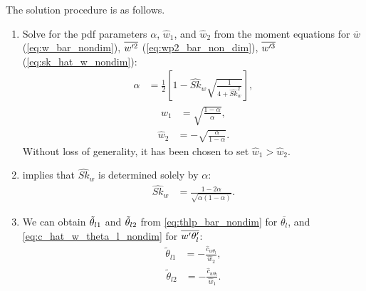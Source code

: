 The solution procedure is as follows.
\begin{enumerate}
    \item Solve for the \gls{pdf} parameters $\alpha$, $\widehat{w}_1$, and $\widehat{w}_2$ from the moment equations for $\overline{w}$ (\cref{eq:w_bar_nondim}), $\overline{w'^2}$ (\cref{eq:wp2_bar_non_dim}), $\overline{w'^3}$ (\cref{eq:sk_hat_w_nondim}):
    \begin{align}
        \label{eq:alpha_solved}
        \alpha
        &= \frac{1}{2}\left[1 - \widehat{Sk}_w \sqrt{\frac{1}{4 + \widehat{Sk}_w^2}}\right],
    \end{align}
    \begin{align}
        \label{eq:w1_solved}
        \widehat{w}_1
        &= \sqrt{\frac{1-\alpha}{\alpha}},
    \end{align}
    \begin{align}
        \label{eq:w2_solved}
        \widehat{w}_2
        &= -\sqrt{\frac{\alpha}{1-\alpha}}.
    \end{align}
    Without loss of generality, it has been chosen to set $\widehat{w}_1 > \widehat{w}_2$.

    \item {} implies that $\widehat{Sk}_w$ is determined solely by $\alpha$:
    \begin{align}
        \label{eq:sk_w_alpha}
        \widehat{Sk}_w
        &= \frac{1-2\alpha}{\sqrt{\alpha(1-\alpha)}}.
    \end{align}

    \item We can obtain $\Tilde{\theta}_{l1}$ and $\Tilde{\theta}_{l2}$ from \cref{eq:thlp_bar_nondim} for $\overline{\theta_l}$, and \cref{eq:c_hat_w_theta_l_nondim} for $\overline{w' \theta_l'}$:
    \begin{align}
        \label{eq:thl1_tilde_solved}
        \tilde{\theta}_{l1}
        &= -\frac{\widehat{c}_{w \theta_l}}{\widehat{w}_2},
    \end{align}
    \begin{align}
        \label{eq:thl2_tilde_solved}
        \tilde{\theta}_{l2}
        &= -\frac{\widehat{c}_{w \theta_l}}{\widehat{w}_1}.
    \end{align}


\end{enumerate}
